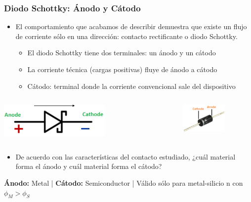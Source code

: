 \documentclass[10pt,t,aspectratio=169]{beamer}
\begin{document}
\begin{frame}[t]
    \frametitle{Diodo Schottky: Ánodo y Cátodo}

    \begin{itemize}
        \item El comportamiento que acabamos de describir demuestra que existe un flujo de corriente sólo en una dirección: contacto rectificante o diodo Schottky.
        \begin{itemize}
            \item El diodo Schottky tiene dos terminales: un ánodo y un cátodo
            \item La corriente técnica (cargas positivas) fluye de ánodo a cátodo
            \item Cátodo: terminal donde la corriente convencional sale del dispositivo
        \end{itemize}
    \end{itemize}

    \begin{columns}
        \begin{column}{0.5\textwidth}
            \centering
            \includegraphics[width=0.6\textwidth]{./figures/diodo-schottky-1.pdf}
        \end{column}
        \begin{column}{0.5\textwidth}
            \centering
            \includegraphics[width=0.6\textwidth]{./figures/diodo-schottky-2.png}
        \end{column}
    \end{columns}

    \begin{itemize}
        \item De acuerdo con las características del contacto estudiado, ¿cuál material forma el ánodo y cuál material forma el cátodo?
    \end{itemize}

    \begin{tcolorbox}
        \centering\textbf{Ánodo:} Metal | \textbf{Cátodo:} Semiconductor | Válido sólo para metal-silicio n con $\phi_M > \phi_S$
    \end{tcolorbox}
\end{frame}
\end{document}
